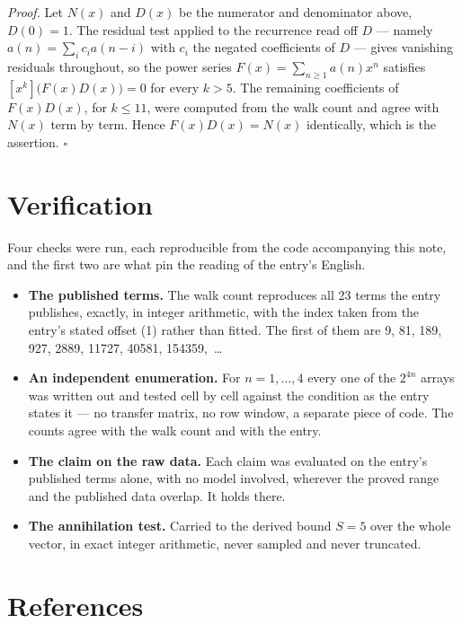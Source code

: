 \documentclass[11pt]{article}
\theoremstyle{definition}
\begin{document}
{\itshape Proof.} Let $N(x)$ and $D(x)$ be the numerator and denominator above, $D(0)=1$. The residual test applied to the recurrence read off $D$ --- namely $a(n) = \sum_i c_i a(n-i)$ with $c_i$ the negated coefficients of $D$ --- gives vanishing residuals throughout, so the power series $F(x)=\sum_{n\ge 1}a(n)x^n$ satisfies $[x^k]\bigl(F(x)D(x)\bigr) = 0$ for every $k > 5$. The remaining coefficients of $F(x)D(x)$, for $k \le 11$, were computed from the walk count and agree with $N(x)$ term by term. Hence $F(x)D(x) = N(x)$ identically, which is the assertion. $\square$

\section{Verification}

Four checks were run, each reproducible from the code accompanying this note, and the first two are what pin the reading of the entry's English.

\begin{itemize}

\item {\bfseries The published terms.} The walk count reproduces all 23 terms the entry publishes, exactly, in integer arithmetic, with the index taken from the entry's stated offset (1) rather than fitted. The first of them are 9, 81, 189, 927, 2889, 11727, 40581, 154359,~\dots

\item {\bfseries An independent enumeration.} For $n = 1,\dots,4$ every one of the $2^{4n}$ arrays was written out and tested cell by cell against the condition as the entry states it --- no transfer matrix, no row window, a separate piece of code. The counts agree with the walk count and with the entry.

\item {\bfseries The claim on the raw data.} Each claim was evaluated on the entry's published terms alone, with no model involved, wherever the proved range and the published data overlap. It holds there.

\item {\bfseries The annihilation test.} Carried to the derived bound $S = 5$ over the whole vector, in exact integer arithmetic, never sampled and never truncated.

\end{itemize}

\section{References}
\end{document}

